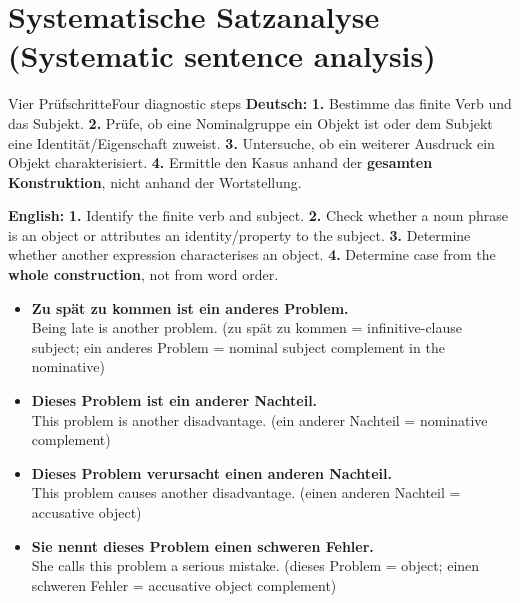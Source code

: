 \documentclass[a4paper,11pt]{article}
\newcommand{\GermanText}[1]{\textbf{Deutsch: }#1\par}
\newcommand{\EnglishText}[1]{{\small\color{SoftGray}\textbf{English: }#1\par}}
\newcommand{\ExampleItem}[2]{\item \textbf{#1}\\{\small\color{SoftGray}#2}}
\begin{document}
\section{Systematische Satzanalyse \textnormal{(Systematic sentence analysis)}}
\begin{grammarentry}{Vier Prüfschritte}{Four diagnostic steps}
\GermanText{\textbf{1.} Bestimme das finite Verb und das Subjekt. \textbf{2.} Prüfe, ob eine Nominalgruppe ein Objekt ist oder dem Subjekt eine Identität/Eigenschaft zuweist. \textbf{3.} Untersuche, ob ein weiterer Ausdruck ein Objekt charakterisiert. \textbf{4.} Ermittle den Kasus anhand der \textbf{gesamten Konstruktion}, nicht anhand der Wortstellung.}
\EnglishText{\textbf{1.} Identify the finite verb and subject. \textbf{2.} Check whether a noun phrase is an object or attributes an identity/property to the subject. \textbf{3.} Determine whether another expression characterises an object. \textbf{4.} Determine case from the \textbf{whole construction}, not from word order.}
\end{grammarentry}
\begin{exbox}\begin{itemize}
\ExampleItem{Zu spät zu kommen ist ein anderes Problem.}{Being late is another problem. (zu spät zu kommen = infinitive-clause subject; ein anderes Problem = nominal subject complement in the nominative)}
\ExampleItem{Dieses Problem ist ein anderer Nachteil.}{This problem is another disadvantage. (ein anderer Nachteil = nominative complement)}
\ExampleItem{Dieses Problem verursacht einen anderen Nachteil.}{This problem causes another disadvantage. (einen anderen Nachteil = accusative object)}
\ExampleItem{Sie nennt dieses Problem einen schweren Fehler.}{She calls this problem a serious mistake. (dieses Problem = object; einen schweren Fehler = accusative object complement)}
\end{itemize}\end{exbox}
\end{document}
